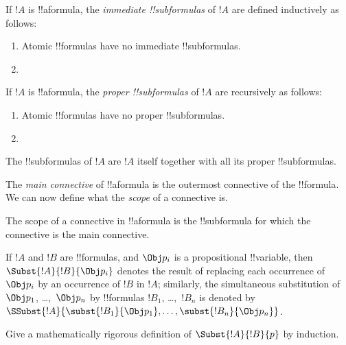 \documentclass[../../../include/open-logic-section]{subfiles}
\begin{document}
\begin{defn}
If $!A$ is !!a{formula}, the \emph{immediate !!{subformula}s}
of $!A$ are defined inductively as follows:
\begin{enumerate}
\item Atomic !!{formula}s have no immediate !!{subformula}s.


\item {}

\end{enumerate}
\end{defn}

\begin{defn}
If $!A$ is !!a{formula}, the \emph{proper !!{subformula}s}
of $!A$ are recursively as follows:
\begin{enumerate}
\item Atomic !!{formula}s have no proper !!{subformula}s.


\item {}
\end{enumerate}
\end{defn}

\begin{defn}[!!^{subformula}]
The !!{subformula}s of $!A$ are $!A$ itself together with all its
proper !!{subformula}s.
\end{defn}

The \emph{main connective} of !!a{formula} is the outermost connective of 
the !!{formula}. We can now define what the \emph{scope} of a connective is.

\begin{defn}[Scope]
The scope of a connective in !!a{formula} is the !!{subformula}
for which the connective is the main connective.
\end{defn}

\begin{defn}
If $!A$ and $!B$ are !!{formula}s, and $\Obj p_i$ is a propositional
!!{variable}, then $\Subst{!A}{!B}{\Obj p_i}$ denotes the result of
replacing each occurrence of $\Obj p_i$ by an occurrence of $!B$ in $!A$;
similarly, the simultaneous substitution of $\Obj p_1$, \dots,~$\Obj p_n$ by
!!{formula}s $!B_1$, \dots,~$!B_n$ is denoted by
$\SSubst{!A}{\subst{!B_1}{\Obj p_1},\dots,\subst{!B_n}{\Obj p_n}}$.
\end{defn}

\begin{prob}
Give a mathematically rigorous definition of $\Subst{!A}{!B}{p}$ by
induction.
\end{prob}
\end{document}
